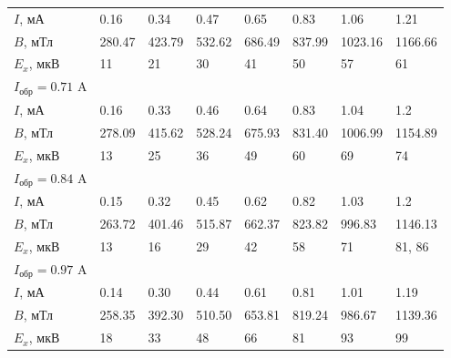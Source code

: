 \documentclass[12pt,a4paper]{article}
\begin{document}
\begin{table}[!h]
\begin{center}
\begin{tabular}{ | l | l | l | l | l | l | l | l |}
                \hline
                $I$, мА     &   0.16    & 0.34  & 0.47  & 0.65  & 0.83  & 1.06      & 1.21      \\
                $B$, мТл    &   280.47  & 423.79& 532.62& 686.49& 837.99& 1023.16   & 1166.66   \\
                $E_x$, мкВ  &   11      & 21    & 30    & 41    & 50    & 57        & 61        \\
                \hline   
                $I_\text{обр} = 0.71$ A  &&&&&&& \\
                \hline
                $I$, мА     &   0.16    & 0.33  & 0.46  & 0.64  & 0.83  & 1.04      & 1.2       \\
                $B$, мТл    &   278.09  & 415.62& 528.24& 675.93& 831.40& 1006.99   & 1154.89   \\
                $E_x$, мкВ  &   13      & 25    & 36    & 49    & 60    & 69        & 74        \\
                \hline   
                $I_\text{обр} = 0.84$ A  &&&&&&& \\
                \hline
                $I$, мА     &   0.15    & 0.32  & 0.45  & 0.62  & 0.82  & 1.03      & 1.2       \\
                $B$, мТл    &   263.72  & 401.46& 515.87& 662.37& 823.82& 996.83    & 1146.13   \\
                $E_x$, мкВ  &   13      & 16    & 29    & 42    & 58    & 71        & 81, 86    \\
                \hline   
                $I_\text{обр} = 0.97$ A  &&&&&&& \\
                \hline
                $I$, мА     &   0.14    & 0.30  & 0.44  & 0.61  & 0.81  & 1.01      & 1.19      \\
                $B$, мТл    &   258.35  & 392.30& 510.50& 653.81& 819.24& 986.67    & 1139.36   \\
                $E_x$, мкВ  &   18      & 33    & 48    & 66    & 81    & 93        & 99   \\
                \hline   
            \end{tabular}
        \end{center}
    \end{table}
\end{document}
